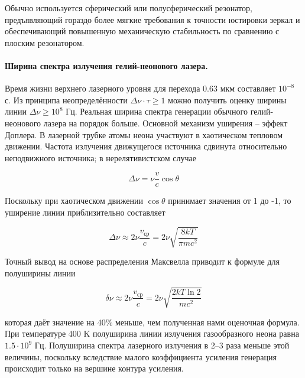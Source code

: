 \documentclass[a4paper,12pt]{article}
\theoremstyle{definition}
\begin{document}
\par Обычно используется сферический или полусферический резонатор, предъявляющий гораздо более мягкие 
требования к точности юстировки зеркал и обеспечивающий повышенную механическую стабильность по
сравнению с плоским резонатором.

\paragraph{Ширина спектра излучения гелий-неонового лазера.} Время жизни верхнего лазерного уровня 
для перехода $0.63$ мкм составляет $10^{-8}$ с.
Из принципа неопределённости $\Delta \nu \cdot \tau \geq 1$ можно получить оценку ширины линии
$\Delta \nu \geq 10^8$ Гц. Реальная ширина спектра генерации обычного гелий-неонового лазера на 
порядок больше. Основной механизм уширения -- эффект Доплера.
В лазерной трубке атомы неона участвуют в хаотическом тепловом движении. Частота излучения 
движущегося источника сдвинута относительно неподвижного источника; в нерелятивистском случае

\begin{equation}
	\Delta \nu = \nu \dfrac{v}{c} \cos \theta
\end{equation}

Поскольку при хаотическом движении $\cos \theta$ принимает значения от 1 до -1, то уширение линии 
приблизительно составляет

\begin{equation}
	\Delta \nu \approx 2\nu \dfrac{v_{ср}}{c} = 2\nu \sqrt{\dfrac{8kT}{\pi m c^2}}
\end{equation}

Точный вывод на основе распределения Максвелла приводит к формуле для полуширины линии

\begin{equation}
	\delta \nu \approx 2\nu \dfrac{v_{ср}}{c} = 2\nu \sqrt{\dfrac{2kT \ln 2}{m c^2}}
\end{equation} 

которая даёт значение на 40\% меньше, чем полученная нами оценочная формула. При температуре 400
K полуширина линии излучения газообразного неона равна $1.5\cdot10^9$ Гц. Полуширина спектра 
лазерного излучения в 2–3 раза меньше этой величины, поскольку вследствие малого коэффициента
усиления генерация происходит только на вершине контура усиления.
\end{document}
